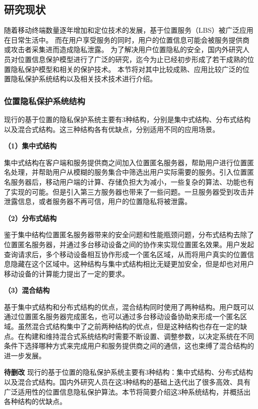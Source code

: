 \documentclass[zihao=-4]{ctexart}
\begin{document}
\subsection{研究现状}
随着移动终端数量逐年增加和定位技术的发展，基于位置服务（LBS）被广泛应用在日常生活中。
而在用户享受服务的同时，用户的位置信息可能会被服务提供商或攻击者采集进而造成隐私泄露。
为了解决用户位置隐私的安全，国内外研究人员对位置信息保护模型进行了广泛的研究，迄今为止已经初步形成了若干成熟的位置隐私保护模型和相关的保护技术。
本节将对其中比较成熟、应用比较广泛的位置隐私保护系统结构以及相关技术技术进行介绍。

\subsubsection{位置隐私保护系统结构}
现行的基于位置的隐私保护系统主要有3种结构，分别是集中式结构、分布式结构以及混合式结构。这三种结构各有优缺点，分别适用不同的应用场景。
\par 
\textbf{（1）集中式结构}
\par 
集中式结构在客户端和服务提供商之间加入位置匿名服务器，帮助用户进行位置匿名处理，并帮助用户从模糊的服务集合中筛选出用户实际需要的服务。\cite{czh_6.1}引入位置匿名服务器后，移动用户端的计算、存储负担大为减小，一些复杂的算法、功能也有了实现的可能。但是引入第三方服务器也带来了一些问题。一旦服务器受到攻击并泄露信息，或者服务器不再可信，用户的位置隐私将被泄露。
\par 
\textbf{（2）分布式结构}
\par 
鉴于集中结构位置匿名服务器带来的安全问题和性能瓶颈问题，分布式结构去除了位置匿名服务器，并通过多台移动设备之间的协作来实现位置匿名效果。用户发起查询请求后，多个移动设备相互协作形成一个匿名区域，从而将用户真实的位置信息隐藏在这个区域中。这种结构与集中式结构相比无疑更加安全，但是却也对用户移动设备的计算能力提出了一定的要求。
\par 
\textbf{（3）混合结构}
\par 
基于集中式结构和分布式结构的优点，混合结构同时使用了两种结构。用户既可以通过位置匿名服务器完成匿名，也可以通过多台移动设备协助来形成一个匿名区域。虽然混合式结构集中了之前两种结构的优点，但是这种结构也存在一定的缺点。在构建和维持混合式系统结构时需要不断设置、调整参数\cite{czh_6.2}，以决定系统在不同条件下选择哪种方式来完成用户和服务提供商之间的通信，这也束缚了混合结构的进一步发展。

\iffalse
\textbf{待删改}
现行的基于位置的隐私保护系统主要有3种结构：集中式结构、分布式结构以及混合式结构。国内外研究人员在这3种结构的基础上迭代出了很多高效、具有广泛适用性的位置信息隐私保护算法。本节将简要介绍这3种系统结构，并概括出各种结构的优缺点。
\end{document}
